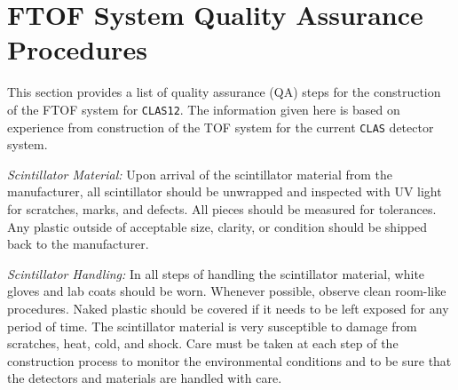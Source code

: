 
\section{FTOF System Quality Assurance Procedures}

This section provides a list of quality assurance (QA) steps for
the construction of the FTOF system for {\tt CLAS12}.  The information
given here is based on experience from construction of the TOF
system for the current {\tt CLAS} detector system.

\vskip 0.5cm

{\it Scintillator Material:}  Upon arrival of the scintillator material
from the manufacturer, all scintillator should be unwrapped and
inspected with UV light for scratches, marks, and defects.  All pieces
should be measured for tolerances.  Any plastic outside of acceptable
size, clarity, or condition should be shipped back to the manufacturer.

\vskip 0.5cm

{\it Scintillator Handling:} In all steps of handling the scintillator
material, white gloves and lab coats should be worn.  Whenever possible,
observe clean room-like procedures.  Naked plastic should be covered if 
it needs to be left exposed for any period of time.  The scintillator 
material is very susceptible to damage from scratches, heat, cold, and 
shock.  Care must be taken at each step of the construction process to 
monitor the environmental conditions and to be sure that the detectors 
and materials are handled with care.

